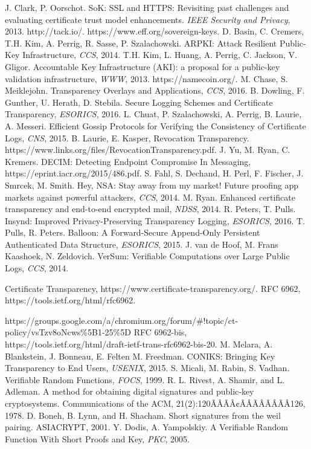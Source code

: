 \documentclass[letterpaper,twocolumn,10pt]{article}
\begin{document}
\begin{thebibliography}{9}

 J. Clark, P. Oorschot. SoK: SSL and HTTPS: Revisiting past challenges and evaluating certificate trust model enhancements. \emph{IEEE Security and Privacy}, 2013.
 http://tack.io/.
 https://www.eff.org/sovereign-keys.
 D. Basin, C. Cremers, T.H. Kim, A. Perrig, R. Sasse, P. Szalachowski. ARPKI: Attack Resilient Public-Key Infrastructure, \emph{CCS}, 2014.
 T.H. Kim, L. Huang, A. Perrig, C. Jackson, V. Gligor. Accountable Key Infrastructure (AKI): a proposal for a public-key validation infrastructure, \emph{WWW}, 2013.
 https://namecoin.org/.
 M. Chase, S. Meiklejohn. Transparency Overlays and Applications, \emph{CCS}, 2016. 
 B. Dowling,  F. Gunther, U. Herath, D. Stebila. Secure Logging Schemes and Certificate Transparency, \emph{ESORICS}, 2016.
 L. Chuat, P. Szalachowski, A. Perrig, B. Laurie, A. Messeri. Efficient Gossip Protocols for Verifying the Consistency of Certificate Logs, \emph{CNS}, 2015. 
 B. Laurie, E. Kasper, Revocation Transparency. https://www.links.org/files/RevocationTransparency.pdf.
 J. Yu, M. Ryan, C. Kremers. DECIM: Detecting Endpoint Compromise In Messaging, https://eprint.iacr.org/2015/486.pdf.
 S. Fahl, S. Dechand, H. Perl, F. Fischer, J. Smrcek, M. Smith. Hey, NSA: Stay away from my market! Future proofing app markets against powerful attackers, \emph{CCS}, 2014.
 M. Ryan. Enhanced certificate transparency and end-to-end encrypted mail, \emph{NDSS}, 2014.
 R. Peters, T. Pulls. Insynd: Improved Privacy-Preserving Transparency Logging, \emph{ESORICS}, 2016.
 T. Pulls, R. Peters. Balloon: A Forward-Secure Append-Only Persistent Authenticated Data Structure, \emph{ESORICS}, 2015.
 J. van de Hoof, M. Frans Kaashoek, N. Zeldovich. VerSum: Verifiable Computations over Large Public Logs, \emph{CCS}, 2014.

 Certificate Transparency, https://www.certificate-transparency.org/.
 RFC 6962, https://tools.ietf.org/html/rfc6962.

 https://groups.google.com/a/chromium.org/forum/\#!topic/ct-policy/vsTzv8oNcws\%5B1-25\%5D
 RFC 6962-bis, https://tools.ietf.org/html/draft-ietf-trans-rfc6962-bis-20.
 M. Melara, A. Blankstein, J. Bonneau, E. Felten M. Freedman. CONIKS: Bringing Key Transparency to End Users, \emph{USENIX}, 2015.
 S. Micali, M. Rabin, S. Vadhan. Verifiable Random Functions, \emph{FOCS}, 1999.
 R. L. Rivest, A. Shamir, and L. Adleman. A method for obtaining digital signatures and public-key cryptosystems. Communications of the ACM, 21(2):120ÃÂÃÂ¢ÃÂÃÂÃÂÃÂ126, 1978.
 D. Boneh, B. Lynn, and H. Shacham. Short signatures from the weil pairing. ASIACRYPT, 2001.
 Y. Dodis, A. Yampolskiy. A Verifiable Random Function With Short Proofs and Key, \emph{PKC}, 2005.


\end{thebibliography}
\end{document}
